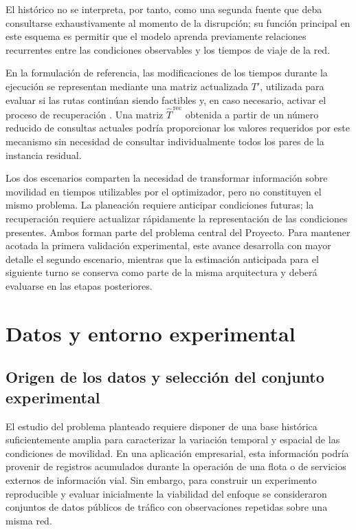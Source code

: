 \documentclass[11pt]{article}
\begin{document}
El histórico no se interpreta, por tanto, como una segunda fuente que deba
consultarse exhaustivamente al momento de la disrupción; su función principal
en este esquema es permitir que el modelo aprenda previamente relaciones
recurrentes entre las condiciones observables y los tiempos de viaje de la
red.

En la formulación de referencia, las modificaciones de los tiempos durante la
ejecución se representan mediante una matriz actualizada \(T'\), utilizada
para evaluar si las rutas continúan siendo factibles y, en caso necesario,
activar el proceso de recuperación
\citep{berth_thesis_2025,berth_trigos_2025}. Una matriz
\(\widehat{T}^{\,\mathrm{rec}}\) obtenida a partir de un número reducido de
consultas actuales podría proporcionar los valores requeridos por este
mecanismo sin necesidad de consultar individualmente todos los pares de la
instancia residual.

Los dos escenarios comparten la necesidad de transformar información sobre
movilidad en tiempos utilizables por el optimizador, pero no constituyen el
mismo problema. La planeación requiere anticipar condiciones futuras; la
recuperación requiere actualizar rápidamente la representación de las
condiciones presentes. Ambos forman parte del problema central del Proyecto.
Para mantener acotada la primera validación experimental, este avance desarrolla
con mayor detalle el segundo escenario, mientras que la estimación anticipada
para el siguiente turno se conserva como parte de la misma arquitectura y
deberá evaluarse en las etapas posteriores.

\section{Datos y entorno experimental}

\subsection{Origen de los datos y selección del conjunto experimental}

El estudio del problema planteado requiere disponer de una base histórica
suficientemente amplia para caracterizar la variación temporal y espacial de
las condiciones de movilidad. En una aplicación empresarial, esta información
podría provenir de registros acumulados durante la operación de una flota o de
servicios externos de información vial. Sin embargo, para construir un
experimento reproducible y evaluar inicialmente la viabilidad del enfoque se
consideraron conjuntos de datos públicos de tráfico con observaciones
repetidas sobre una misma red.
\end{document}
